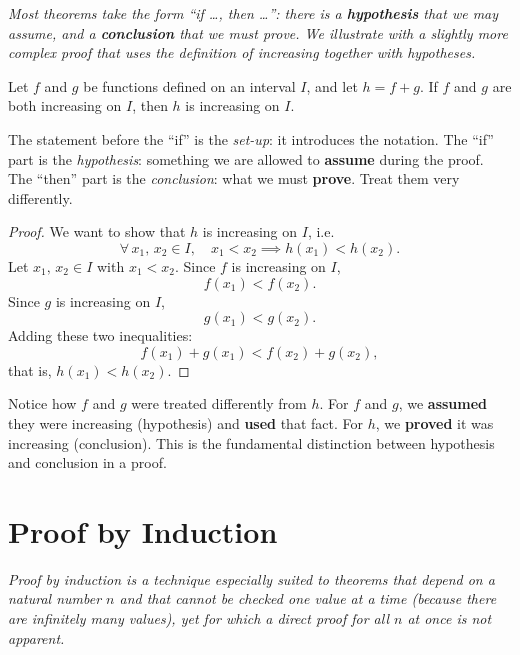 \textit{Most theorems take the form ``if \ldots, then \ldots'': there is a \textbf{hypothesis} that we may assume, and a \textbf{conclusion} that we must prove.  We illustrate with a slightly more complex proof that uses the definition of increasing together with hypotheses.}

\begin{theorem}
\label{thm:1-11}
Let $f$ and $g$ be functions defined on an interval $I$, and let $h = f + g$.  If $f$ and $g$ are both increasing on $I$, then $h$ is increasing on $I$.
\end{theorem}

\begin{remark}
The statement before the ``if'' is the \emph{set-up}: it introduces the notation.  The ``if'' part is the \emph{hypothesis}: something we are allowed to \textbf{assume} during the proof.  The ``then'' part is the \emph{conclusion}: what we must \textbf{prove}.  Treat them very differently.
\end{remark}

\begin{proof}
We want to show that $h$ is increasing on $I$, i.e.\
\[
  \forall\, x_{1},\, x_{2} \in I, \quad x_{1} < x_{2} \implies h(x_{1}) < h(x_{2}).
\]
Let $x_{1},\, x_{2} \in I$ with $x_{1} < x_{2}$.  Since $f$ is increasing on $I$,
\[
  f(x_{1}) < f(x_{2}).
\]
Since $g$ is increasing on $I$,
\[
  g(x_{1}) < g(x_{2}).
\]
Adding these two inequalities:
\[
  f(x_{1}) + g(x_{1}) < f(x_{2}) + g(x_{2}),
\]
that is, $h(x_{1}) < h(x_{2})$.
\end{proof}

\begin{remark}
Notice how $f$ and $g$ were treated differently from $h$.  For $f$ and $g$, we \textbf{assumed} they were increasing (hypothesis) and \textbf{used} that fact.  For $h$, we \textbf{proved} it was increasing (conclusion).  This is the fundamental distinction between hypothesis and conclusion in a proof.
\end{remark}

\section{Proof by Induction}
\label{sec:1.14}

\textit{Proof by induction is a technique especially suited to theorems that depend on a natural number $n$ and that cannot be checked one value at a time (because there are infinitely many values), yet for which a direct proof for all $n$ at once is not apparent.}

